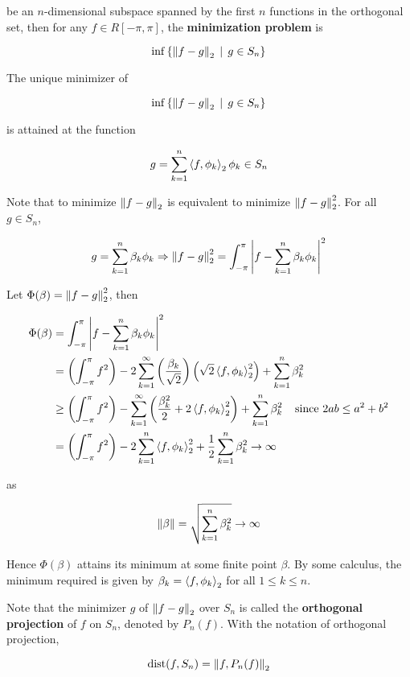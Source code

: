 \documentclass[a4paper,12pt]{article}
\begin{document}
be an $n$-dimensional subspace spanned by the first $n$ functions in the orthogonal set, then for any $f\in R[-\pi,\pi]$, the \textbf{minimization problem} is

$$\inf\left\{ \left\| f-g\right\|_{2}\,\mid\, g\in S_{n}\right\}$$\s

\begin{pst}
  The unique minimizer of

  $$\inf\left\{ \left\| f-g\right\|_{2}\,\mid\, g\in S_{n}\right\}$$\s

  is attained at the function

  $$g=\sum_{k=1}^{n}\left\langle f,\phi_{k}\right\rangle_{2}\phi_{k}\in S_{n}$$\s

  \prf Note that to minimize $\left\| f-g\right\|_{2}$ is equivalent to minimize $\left\| f-g\right\|_{2}^{2}$. For all $g\in S_{n}$,

  $$g=\sum_{k=1}^{n}\beta_{k}\phi_{k}\Rightarrow\left\| f-g\right\|_{2}^{2}=\int_{-\pi}^{\pi}\left| f-\sum_{k=1}^{n}\beta_{k}\phi_{k}\right|^{2}$$\s

  Let $\Phi(\beta)=\left\| f-g\right\|_{2}^{2}$, then

  $$\begin{aligned}[t]
    \Phi(\beta)&=\int_{-\pi}^{\pi}\left| f-\sum_{k=1}^{n}\beta_{k}\phi_{k}\right|^{2}\\
    &=\left( \int_{-\pi}^{\pi}f^{2}\right)-2\sum_{k=1}^{\infty}\left( \frac{\beta_{k}}{\sqrt{2}}\right)\left( \sqrt{2}\left\langle f,\phi_{k}\right\rangle_{2}^{2}\right)+\sum_{k=1}^{n}\beta_{k}^{2}\\
    &\geq\left( \int_{-\pi}^{\pi}f^{2}\right)-\sum_{k=1}^{\infty}\left( \frac{\beta_{k}^{2}}{2}+2\left\langle f,\phi_{k}\right\rangle_{2}^{2}\right)+\sum_{k=1}^{n}\beta_{k}^{2}\;\;\;\;\text{since }2ab\leq a^{2}+b^{2}\\
    &=\left( \int_{-\pi}^{\pi}f^{2}\right)-2\sum_{k=1}^{n}\left\langle f,\phi_{k}\right\rangle_{2}^{2}+\frac{1}{2}\sum_{k=1}^{n}\beta_{k}^{2}\to\infty
  \end{aligned}$$\s

  as

  $$\left\| \beta\right\|=\sqrt{\sum_{k=1}^{n}\beta_{k}^{2}}\to\infty$$\s

  Hence $\Phi(\beta)$ attains its minimum at some finite point $\beta$. By some calculus, the minimum required is given by $\beta_{k}=\left\langle f,\phi_{k}\right\rangle_{2}$ for all $1\leq k\leq n$.
\end{pst}\n

Note that the minimizer $g$ of $\left\| f-g\right\|_{2}$ over $S_{n}$ is called the \textbf{orthogonal projection} of $f$ on $S_{n}$, denoted by $P_{n}(f)$. With the notation of orthogonal projection,

$$\mathrm{dist}(f,S_{n})=\left\| f,P_{n}(f)\right\|_{2}$$\s
\end{document}
